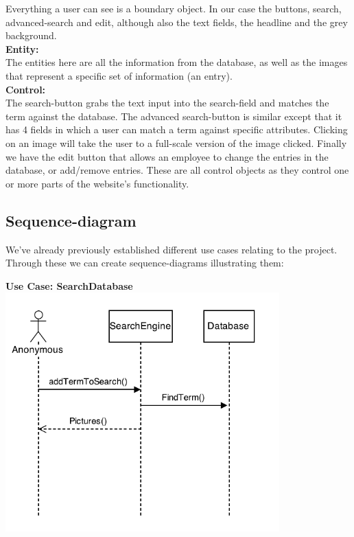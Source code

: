 \documentclass[12pt,a4paper]{article}
\begin{document}
Everything a user can see is a boundary object. In our case the buttons, search, advanced-search and edit, although also the text fields, the headline and the grey background.\\

\textbf{Entity:}\\

The entities here are all the information from the database, as well as the images that represent a specific set of information (an entry).\\

\textbf{Control:}\\

The search-button grabs the text input into the search-field and matches the term against the database.
The advanced search-button is similar except that it has 4 fields in which a user can match a term against specific attributes. 
Clicking on an image will take the user to a full-scale version of the image clicked.
Finally we have the edit button that allows an employee to change the entries in the database, or add/remove entries.
These are all control objects as they control one or more parts of the website's functionality.


\newpage
\subsection{Sequence-diagram}
We've already previously established different use cases relating to the project. Through these we can create sequence-diagrams illustrating them:

{\bf Use Case: SearchDatabase}\\

\includegraphics[height=92mm]{UseCase1.png}
\end{document}
